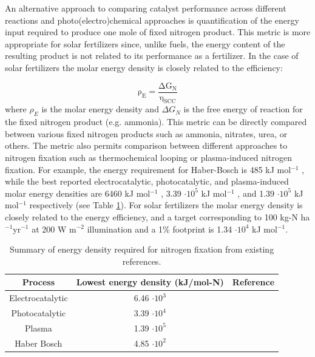 
An alternative approach to comparing catalyst performance across different reactions and photo(electro)chemical approaches is quantification of the energy input required to produce one mole of fixed nitrogen product. This metric is more appropriate for solar fertilizers since, unlike fuels, the energy content of the resulting product is not related to its performance as a fertilizer. In the case of solar fertilizers the molar energy density is closely related to the efficiency:

\begin{equation}
\mathrm{
\rho_{E} = \frac{\Delta G_{N}}{\eta_{SCC}}
}
\label{eq:eng_dens}
\end{equation}
where $\rho_{E}$ is the molar energy density and $\Delta G_{N}$ is the free energy of reaction for the fixed nitrogen product (e.g. ammonia). This metric can be directly compared between various fixed nitrogen products such as ammonia, nitrates, urea, or others. The metric also permits comparison between different approaches to nitrogen fixation such as thermochemical looping or plasma-induced nitrogen fixation. For example, the energy requirement for Haber-Bosch is 485 kJ mol$^{-1}$ \cite{Schloegl_2003}, while the best reported electrocatalytic, photocatalytic, and plasma-induced molar energy densities are  6460 kJ mol$^{-1}$ \cite{Song_2018}, 3.39 $\cdot 10^5$ kJ mol$^{-1}$  \cite{Shiraishi_2018}, and 1.39 $\cdot 10^5$ kJ mol$^{-1}$ \cite{Hawtof_2019} respectively (see Table \ref{tab:energy_density}). For solar fertilizers the molar energy density is closely related to the energy efficiency, and a target corresponding to 100 kg-N ha$^{-1}$yr$^{-1}$ at 200 W m$^{-2}$ illumination and a 1\% footprint is 1.34 $\cdot 10^4$ kJ mol$^{-1}$. 

\begin{table}
\centering
\begin{tabular}{ |c c c| }
\hline
 Process & Lowest energy density (kJ/mol-N) & Reference \\  \hline
 Electrocatalytic & 6.46 $\cdot 10^3$ & \cite{Song_2018} \\ \hline
 Photocatalytic & 3.39 $\cdot 10^4$ & \cite{Shiraishi_2018} \\ \hline
 Plasma & 1.39 $\cdot 10^5$ & \cite{Hawtof_2019} \\ \hline
 Haber Bosch & 4.85 $\cdot 10^2$ & \cite{Schloegl_2003} \\ \hline
\end{tabular}
\caption{Summary of energy density required for nitrogen fixation from existing references.}
\label{tab:energy_density}
\end{table}


